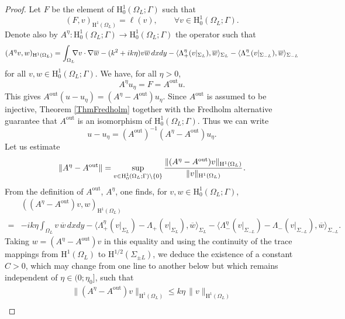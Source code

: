 \documentclass[11pt,a4paper]{report}
\newcommand{\dsp}{\displaystyle}
\newcommand{\Om}{\Omega}
\newcommand{\mrm}[1]{\mathrm{#1}}
\newcommand{\mH}{\mrm{H}}
\begin{document}
\begin{proof}
Let $F$ be the element of $\mH^1_0(\Om_L;\Gamma)$ such that 
\[
(F,v)_{\mH^1(\Om_L)}=\ell(v),\qquad\forall v\in\mH^1_0(\Om_L;\Gamma).
\]
Denote also by $A^\eta:\mH^1_0(\Om_L;\Gamma)\to\mH^1_0(\Om_L;\Gamma)$ the operator such that
\[
(A^\eta v,w)_{\mH^1(\Om_L)}=\dsp\int_{\Om_L}\hspace{-0.2cm}\nabla v\cdot\nabla\overline{w}-(k^2+ik\eta) v\overline{w}\,dxdy-\langle\Lambda^\eta_+(v|_{\Sigma_{L}}),\overline{w} \rangle_{\Sigma_L}-\langle\Lambda^\eta_-(v|_{\Sigma_{-L}}),\overline{w} \rangle_{\Sigma_{-L}}
\]  
for all $v,w\in\mH^1_0(\Om_L;\Gamma)$. We have, for all $\eta>0$,
\[
A^\eta u_\eta=F=A^{\mrm{out}} u. 
\]
This gives $A^{\mrm{out}} (u-u_\eta)=(A^\eta-A^{\mrm{out}})u_\eta$. Since $A^{\mrm{out}}$ is assumed to be injective, Theorem \ref{ThmFredholm} together with the Fredholm alternative guarantee that $A^{\mrm{out}}$ is an isomorphism of $\mH^1_0(\Om_L;\Gamma)$. Thus we can write
\begin{equation}\label{Relation1}
u-u_\eta=(A^{\mrm{out}})^{-1} (A^\eta-A^{\mrm{out}})u_\eta.
\end{equation}
Let us estimate
\begin{equation}\label{DefNormDif}
\|A^\eta-A^{\mrm{out}}\| =\underset{v\in\mH^1_0(\Om_L;\Gamma)\setminus\{0\}}{\sup}\,\cfrac{\|(A^\eta -A^{\mrm{out}}) v\|_{\mH^1(\Om_L)}}{\|v\|_{\mH^1(\Om_L)}}\,.
\end{equation}
From the definition of $A^{\mrm{out}}$, $A^\eta$, one finds, for $v,w\in\mH^1_0(\Om_L;\Gamma)$, 
\[
\begin{array}{ll}
&((A^\eta -A^{\mrm{out}}) v,w)_{\mH^1(\Om_L)} \\[8pt]
=&-ik\eta\dsp\int_{\Om_L} v\,\overline{w}\,dxdy -\langle\Lambda^\eta_+(v|_{\Sigma_{L}})-\Lambda_+(v|_{\Sigma_{L}}),\overline{w} \rangle_{\Sigma_L}-\langle\Lambda^\eta_-(v|_{\Sigma_{-L}})-\Lambda_-(v|_{\Sigma_{-L}}),\overline{w }\rangle_{\Sigma_{-L}}. 
\end{array}
\]
Taking $w=(A^\eta -A^{\mrm{out}}) v$ in this equality and using the continuity of the trace mappings from $\mH^1(\Om_L)$ to $\mH^{1/2}(\Sigma_{\pm L})$, we deduce the existence of a constant
$C>0$, which may change from one line to another below but which remains independent of $\eta\in(0;\eta_0]$, such that
\begin{equation}\label{DefNormDif2}
\begin{array}{l}
\|(A^\eta -A^{\mrm{out}}) v\|_{\mH^1(\Om_L)} \le k\eta\,\|v\|_{\mH^1(\Om_L)}\\[9pt]

\end{array}
\end{equation}
\end{proof}
\end{document}
